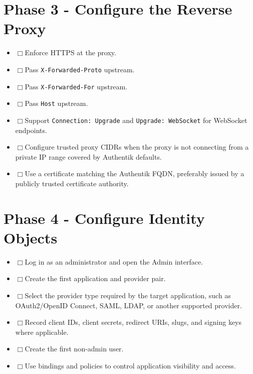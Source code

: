 \documentclass[11pt]{article}
\newcommand{\checkbox}{$\Box$\hspace{0.4em}}
\begin{document}
\section*{Phase 3 - Configure the Reverse Proxy}
\begin{itemize}
\item \checkbox Enforce HTTPS at the proxy.
\item \checkbox Pass \texttt{X-Forwarded-Proto} upstream.
\item \checkbox Pass \texttt{X-Forwarded-For} upstream.
\item \checkbox Pass \texttt{Host} upstream.
\item \checkbox Support \texttt{Connection: Upgrade} and \texttt{Upgrade: WebSocket} for WebSocket endpoints.
\item \checkbox Configure trusted proxy CIDRs when the proxy is not connecting from a private IP range covered by Authentik defaults.
\item \checkbox Use a certificate matching the Authentik FQDN, preferably issued by a publicly trusted certificate authority.
\end{itemize}

\section*{Phase 4 - Configure Identity Objects}
\begin{itemize}
\item \checkbox Log in as an administrator and open the Admin interface.
\item \checkbox Create the first application and provider pair.
\item \checkbox Select the provider type required by the target application, such as OAuth2/OpenID Connect, SAML, LDAP, or another supported provider.
\item \checkbox Record client IDs, client secrets, redirect URIs, slugs, and signing keys where applicable.
\item \checkbox Create the first non-admin user.
\item \checkbox Use bindings and policies to control application visibility and access.
\end{itemize}
\end{document}
